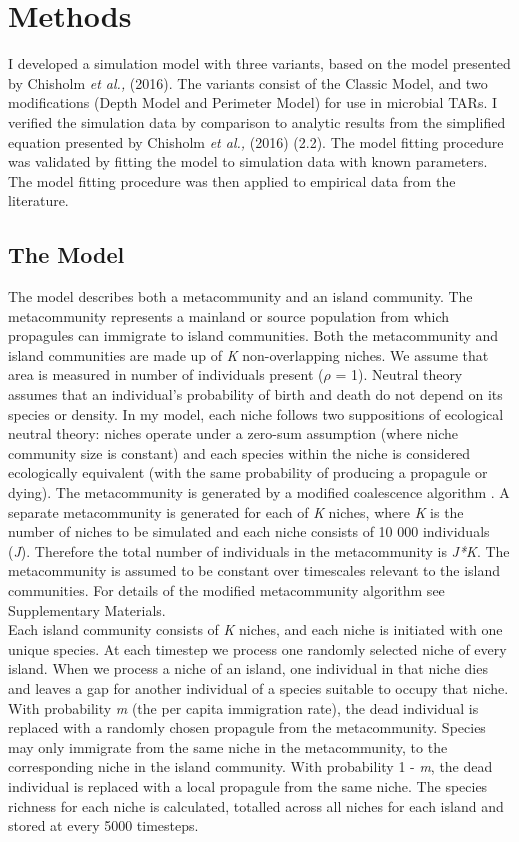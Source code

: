 \chapter{Methods}

I developed a simulation model with three variants, based on the model presented by Chisholm \textit{et al.,} (2016). The variants consist of the Classic Model, and two modifications (Depth Model and Perimeter Model) for use in microbial TARs. I verified the simulation data by comparison to analytic results from the simplified equation presented by Chisholm \textit{et al.,} (2016) (2.2). The model fitting procedure was validated by fitting the model to simulation data with known parameters. The model fitting procedure was then applied to empirical data from the literature.  

\section{The Model}
\noindent The model describes both a metacommunity and an island community. The metacommunity represents a mainland or source population from which propagules can immigrate to island communities. Both the metacommunity and island communities are made up of \textit{K} non-overlapping niches. We assume that area is measured in number of individuals present ($\rho$ = 1). Neutral theory assumes that an individual's probability of birth and death do not depend on its species or density. In my model, each niche follows two suppositions of ecological neutral theory: niches operate under a zero-sum assumption (where niche community size is constant) and each species within the niche is considered ecologically equivalent (with the same probability of producing a propagule or dying). The metacommunity is generated by a modified coalescence algorithm \cite{rosindell2008coalescence}. 
A separate metacommunity is generated for each of \textit{K} niches, where \textit{K} is the number of niches to be simulated and each niche consists of 10 000 individuals (\textit{J}). Therefore the total number of individuals in the metacommunity is \textit{J*K}. The metacommunity is assumed to be constant over timescales relevant to the island communities. For details of the modified metacommunity algorithm see Supplementary Materials.\\

\noindent Each island community consists of \textit{K} niches, and each niche is initiated with one unique species. At each timestep we process one randomly selected niche of every island. When we process a niche of an island, one individual in that niche dies and leaves a gap for another individual of a species suitable to occupy that niche. With probability \textit{m} (the per capita immigration rate), the dead individual is replaced with a randomly chosen propagule from the metacommunity. Species may only immigrate from the same niche in the metacommunity, to the corresponding niche in the island community. With probability 1 - \textit{m}, the dead individual is replaced with a local propagule from the same niche. The species richness for each niche is calculated, totalled across all niches for each island and stored at every 5000 timesteps.\\

